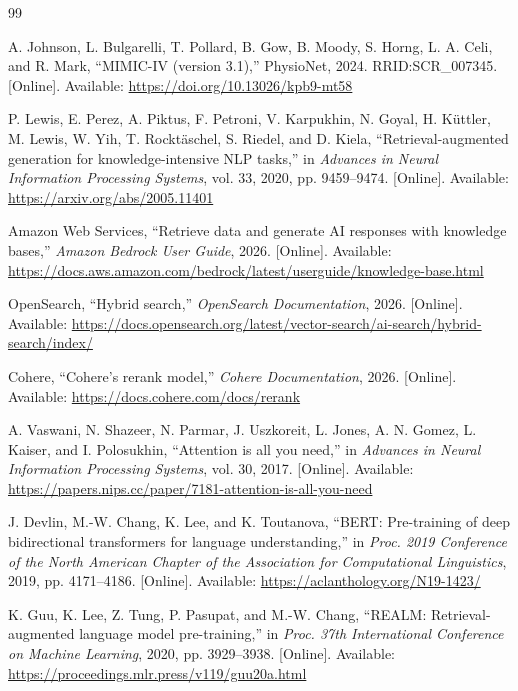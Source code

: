 \begin{thebibliography}{99}

A. Johnson, L. Bulgarelli, T. Pollard, B. Gow, B. Moody, S. Horng, L. A. Celi, and R. Mark,
``MIMIC-IV (version 3.1),''
PhysioNet, 2024.
RRID:SCR\_007345.
[Online]. Available: \url{https://doi.org/10.13026/kpb9-mt58}

P. Lewis, E. Perez, A. Piktus, F. Petroni, V. Karpukhin, N. Goyal, H. K{\"u}ttler, M. Lewis, W. Yih, T. Rockt{\"a}schel, S. Riedel, and D. Kiela,
``Retrieval-augmented generation for knowledge-intensive NLP tasks,''
in \textit{Advances in Neural Information Processing Systems}, vol. 33, 2020, pp. 9459--9474.
[Online]. Available: \url{https://arxiv.org/abs/2005.11401}

Amazon Web Services,
``Retrieve data and generate AI responses with knowledge bases,''
\textit{Amazon Bedrock User Guide}, 2026.
[Online]. Available: \url{https://docs.aws.amazon.com/bedrock/latest/userguide/knowledge-base.html}

OpenSearch,
``Hybrid search,''
\textit{OpenSearch Documentation}, 2026.
[Online]. Available: \url{https://docs.opensearch.org/latest/vector-search/ai-search/hybrid-search/index/}

Cohere,
``Cohere's rerank model,''
\textit{Cohere Documentation}, 2026.
[Online]. Available: \url{https://docs.cohere.com/docs/rerank}



A. Vaswani, N. Shazeer, N. Parmar, J. Uszkoreit, L. Jones, A. N. Gomez, L. Kaiser, and I. Polosukhin,
``Attention is all you need,''
in \textit{Advances in Neural Information Processing Systems}, vol. 30, 2017.
[Online]. Available: \url{https://papers.nips.cc/paper/7181-attention-is-all-you-need}

J. Devlin, M.-W. Chang, K. Lee, and K. Toutanova,
``BERT: Pre-training of deep bidirectional transformers for language understanding,''
in \textit{Proc. 2019 Conference of the North American Chapter of the Association for Computational Linguistics}, 2019, pp. 4171--4186.
[Online]. Available: \url{https://aclanthology.org/N19-1423/}


K. Guu, K. Lee, Z. Tung, P. Pasupat, and M.-W. Chang,
``REALM: Retrieval-augmented language model pre-training,''
in \textit{Proc. 37th International Conference on Machine Learning}, 2020, pp. 3929--3938.
[Online]. Available: \url{https://proceedings.mlr.press/v119/guu20a.html}


\end{thebibliography}
